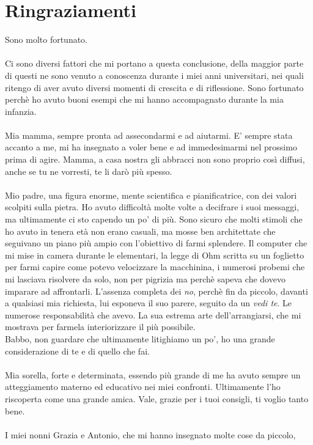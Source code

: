 \chapter{Ringraziamenti}\label{ch:ringraziamenti}
Sono molto fortunato.\\\\
 Ci sono diversi fattori che mi portano a questa conclusione, della maggior parte di questi
ne sono venuto a conoscenza durante i miei anni universitari, nei quali ritengo di aver avuto diversi momenti di crescita
e di riflessione.
Sono fortunato perchè ho avuto buoni esempi che mi hanno accompagnato durante la mia infanzia.
\\\\Mia mamma, sempre pronta ad assecondarmi e ad aiutarmi. E' sempre stata accanto a me, mi ha insegnato a voler bene e ad immedesimarmi nel prossimo prima di agire.
Mamma, a casa nostra gli abbracci non sono proprio così diffusi, anche se tu ne vorresti, te li darò più spesso.
\\\\Mio padre, una figura enorme, mente scientifica e pianificatrice, con dei valori scolpiti sulla pietra. Ho avuto difficoltà molte volte a decifrare i suoi messaggi,
ma ultimamente ci sto capendo un po' di più. Sono sicuro che molti stimoli che ho avuto in tenera età non erano casuali, ma mosse ben architettate
che seguivano un piano più ampio con l'obiettivo di farmi splendere. Il computer che mi mise in camera durante le elementari, la legge di Ohm scritta su un foglietto per farmi capire 
come potevo velocizzare la macchinina, i numerosi probemi che mi lasciava risolvere da solo, non per pigrizia ma perchè sapeva che dovevo imparare ad affrontarli.
 L'assenza completa dei \emph{no}, perchè fin da piccolo, davanti a qualsiasi mia richiesta, lui esponeva il suo parere, seguito da un \emph{vedi te}.
Le numerose responsabilità che avevo. La sua estrema arte dell'arrangiarsi, che mi mostrava per farmela interiorizzare il più possibile.
\\Babbo, non guardare che ultimamente litighiamo un po', ho una grande considerazione di te e di quello che fai.
\\\\Mia sorella, forte e determinata, essendo più grande di me ha avuto sempre un atteggiamento materno ed educativo nei miei confronti. 
Ultimamente l'ho riscoperta come una grande amica.
Vale, grazie per i tuoi consigli, ti voglio tanto bene.
\\\\
I miei nonni Grazia e Antonio, che mi hanno insegnato molte cose da piccolo,
